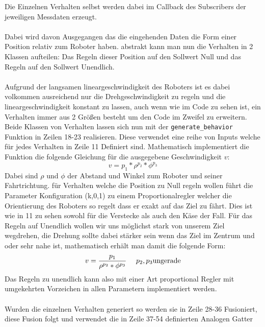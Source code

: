 \documentclass[11pt,a4paper]{article}
\begin{document}
Die Einzelnen Verhalten selbst werden dabei im Callback des Subscribers der jeweiligen Messdaten erzeugt.\\
\\
Dabei wird davon Ausgegangen das die eingehenden Daten die Form einer Position relativ zum Roboter haben.
abstrakt kann man nun die Verhalten in 2 Klassen aufteilen: 
Das Regeln dieser Position auf den Sollwert Null und das Regeln auf den Sollwert Unendlich.\\
\\
Aufgrund der langsamen lineargeschwindigkeit des Roboters ist es dabei volkommen ausreichend nur die Drehgeschwindigkeit zu regeln und die lineargeschwindigkeit konstant zu lassen, auch wenn wie im Code zu sehen ist, ein Verhalten immer aus 2 Größen besteht um den Code im Zweifel zu erweitern.
Beide Klassen von Verhalten lassen sich nun mit der \texttt{generate\_behavior} Funktion in Zeilen 18-23 realisieren.
Diese verwendet eine reihe von Inputs welche für jedes Verhalten in Zeile 11 Definiert sind.
Mathematisch implementiert die Funktion die folgende Gleichung für die ausgegebene Geschwindigkeit $v$:
\begin{equation}
	v = p_1*\rho^{p_2}*\phi^{p_3}
\end{equation}
Dabei sind $\rho$ und $\phi$ der Abstand und Winkel zum Roboter und seiner Fahrtrichtung.
für Verhalten welche die Position zu Null regeln wollen führt die Parameter Konfiguration (k,0,1) zu einem Proportionalregler welcher die Orientierung des Roboters so regelt dass er exakt auf das Ziel zu fährt.
Dies ist wie in 11 zu sehen sowohl für die Verstecke als auch den Käse der Fall.
Für das Regeln auf Unendlich wollen wir uns möglichst stark von unserem Ziel wegdrehen, die Drehung sollte dabei stärker sein wenn das Ziel im Zentrum und oder sehr nahe ist, mathematisch erhält man damit die folgende Form:
\begin{equation}
	v= \frac{p_1}{\rho^{p_2}*\phi^{p_3}} ~~~~ p_2,p_3 \textnormal{ungerade}
\end{equation}
Das Regeln zu unendlich kann also mit einer Art proportional Regler mit umgekehrten Vorzeichen in allen Parametern implementiert werden.\\
\\

Wurden die einzelnen Verhalten generiert so werden sie in Zeile 28-36 Fusioniert, diese Fusion folgt  und verwendet die in Zeile 37-54 definierten Analogen Gatter
\end{document}
